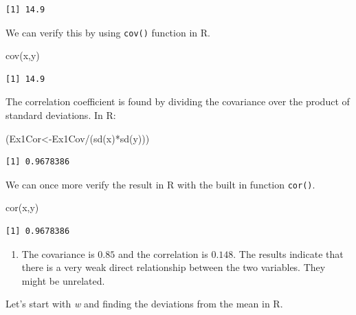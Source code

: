 \documentclass[
  letterpaper,
  DIV=11,
  numbers=noendperiod]{scrreprt}
\newenvironment{Shaded}{\begin{snugshade}}{\end{snugshade}}
\newcommand{\FunctionTok}[1]{\textcolor[rgb]{0.28,0.35,0.67}{#1}}
\newcommand{\NormalTok}[1]{\textcolor[rgb]{0.00,0.23,0.31}{#1}}
\newcommand{\OtherTok}[1]{\textcolor[rgb]{0.00,0.23,0.31}{#1}}
\newcommand{\SpecialCharTok}[1]{\textcolor[rgb]{0.37,0.37,0.37}{#1}}
\providecommand{\tightlist}{%
  \setlength{\itemsep}{0pt}\setlength{\parskip}{0pt}}\usepackage{longtable,booktabs,array}
\begin{document}
\begin{verbatim}
[1] 14.9
\end{verbatim}

We can verify this by using \texttt{cov()} function in R.

\begin{Shaded}
\begin{Highlighting}[numbers=left,,]
\FunctionTok{cov}\NormalTok{(x,y)}
\end{Highlighting}
\end{Shaded}

\begin{verbatim}
[1] 14.9
\end{verbatim}

The correlation coefficient is found by dividing the covariance over the
product of standard deviations. In R:

\begin{Shaded}
\begin{Highlighting}[numbers=left,,]
\NormalTok{(Ex1Cor}\OtherTok{\textless{}{-}}\NormalTok{Ex1Cov}\SpecialCharTok{/}\NormalTok{(}\FunctionTok{sd}\NormalTok{(x)}\SpecialCharTok{*}\FunctionTok{sd}\NormalTok{(y)))}
\end{Highlighting}
\end{Shaded}

\begin{verbatim}
[1] 0.9678386
\end{verbatim}

We can once more verify the result in R with the built in function
\texttt{cor()}.

\begin{Shaded}
\begin{Highlighting}[numbers=left,,]
\FunctionTok{cor}\NormalTok{(x,y)}
\end{Highlighting}
\end{Shaded}

\begin{verbatim}
[1] 0.9678386
\end{verbatim}

\begin{enumerate}
\def\labelenumi{\arabic{enumi}.}
\setcounter{enumi}{1}
\tightlist
\item
  The covariance is \(0.85\) and the correlation is \(0.148\). The
  results indicate that there is a very weak direct relationship between
  the two variables. They might be unrelated.
\end{enumerate}

Let's start with \emph{w} and finding the deviations from the mean in R.
\end{document}
